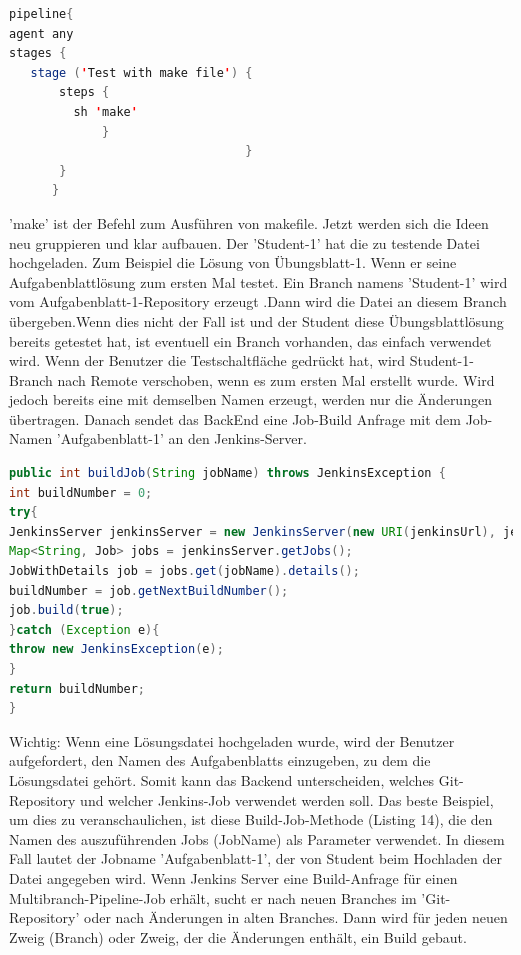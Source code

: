 \documentclass[a4paper,12pt,oneside]{book}
\begin{document}
\begin{lstlisting}[language=JAVA,caption=Jenkinsfile (Job-Pipeline-Skript) ]
pipeline{
agent any
stages {   
   stage ('Test with make file') {
       steps {
         sh 'make'
             }
                                 }
       }
      }
\end{lstlisting} 
'make' ist der Befehl zum Ausführen von makefile.
\newline
Jetzt werden sich die Ideen neu gruppieren und klar aufbauen. Der 'Student-1' hat die zu testende Datei hochgeladen. Zum Beispiel die Lösung von Übungsblatt-1. Wenn er seine Aufgabenblattlösung zum ersten Mal testet. Ein Branch namens 'Student-1' wird vom Aufgabenblatt-1-Repository erzeugt .Dann wird die Datei an diesem Branch übergeben.Wenn dies nicht der Fall ist und der Student diese Übungsblattlösung bereits getestet hat, ist eventuell ein Branch vorhanden, das einfach verwendet wird. Wenn der Benutzer die Testschaltfläche gedrückt hat, wird Student-1-Branch nach Remote verschoben, wenn es zum ersten Mal erstellt wurde. Wird jedoch bereits eine mit demselben Namen erzeugt, werden nur die Änderungen übertragen. Danach sendet das BackEnd eine Job-Build Anfrage mit dem Job-Namen 'Aufgabenblatt-1' an den Jenkins-Server. 
\begin{lstlisting}[language=JAVA,caption=Job-Build Anfrage ]
	public int buildJob(String jobName) throws JenkinsException {
int buildNumber = 0;
try{
JenkinsServer jenkinsServer = new JenkinsServer(new URI(jenkinsUrl), jenkinsUser, jenkinsPassword);
Map<String, Job> jobs = jenkinsServer.getJobs();
JobWithDetails job = jobs.get(jobName).details();
buildNumber = job.getNextBuildNumber();
job.build(true);
}catch (Exception e){
throw new JenkinsException(e);
}
return buildNumber;
}
\end{lstlisting} 
Wichtig: Wenn eine Lösungsdatei hochgeladen wurde, wird der Benutzer aufgefordert, den Namen des Aufgabenblatts einzugeben, zu dem die Lösungsdatei gehört. Somit kann das Backend unterscheiden, welches Git-Repository und welcher Jenkins-Job verwendet werden soll. Das beste Beispiel, um dies zu veranschaulichen, ist diese Build-Job-Methode (Listing 14), die den Namen des auszuführenden Jobs (JobName) als Parameter verwendet. In diesem Fall lautet der Jobname 'Aufgabenblatt-1', der von Student beim Hochladen der Datei angegeben wird.
\newline
Wenn Jenkins Server eine Build-Anfrage für einen Multibranch-Pipeline-Job erhält, sucht er nach neuen Branches im 'Git-Repository' oder nach Änderungen in alten Branches. Dann wird für jeden neuen Zweig (Branch) oder Zweig, der die Änderungen enthält, ein Build gebaut.
\end{document}
